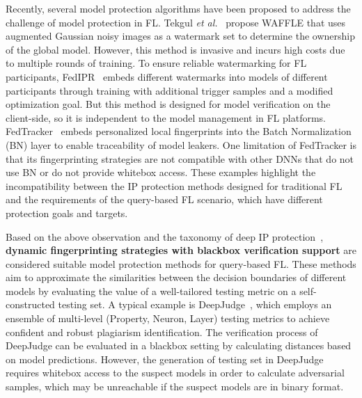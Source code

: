 \documentclass[journal]{IEEEtran}
\begin{document}
Recently, several model protection algorithms have been proposed to address the challenge of model protection in FL. 
Tekgul \textit{et al.}~\cite{tekgul2021waffle} propose WAFFLE that uses augmented Gaussian noisy images as a watermark set to determine the ownership of the global model. 
However, this method is invasive and incurs high costs due to multiple rounds of training.
To ensure reliable watermarking for FL participants, FedIPR~\cite{li2023fedipr} embeds different watermarks into models of different participants through training with additional trigger samples and a modified optimization goal.
But this method is designed for model verification on the client-side, so it is independent to the model management in FL platforms.
FedTracker~\cite{shao2022fedtracker} embeds personalized local fingerprints into the Batch Normalization (BN) layer to enable traceability of model leakers.
One limitation of FedTracker is that its fingerprinting strategies are not compatible with other DNNs that do not use BN or do not provide whitebox access.
These examples highlight the incompatibility between the IP protection methods designed for traditional FL and the requirements of the query-based FL scenario, which have different protection goals and targets.

Based on the above observation and the taxonomy of deep IP protection~\cite{peng2022intellectual, sun2023deep}, \textbf{dynamic fingerprinting strategies with blackbox verification support} are considered suitable model protection methods for query-based FL.
These methods aim to approximate the similarities between the decision boundaries of different models by evaluating the value of a well-tailored testing metric on a self-constructed testing set.
A typical example is DeepJudge~\cite{chen2022copy}, which employs an ensemble of multi-level (Property, Neuron, Layer) testing metrics to achieve confident and robust plagiarism identification. 
The verification process of DeepJudge can be evaluated in a blackbox setting by calculating distances based on model predictions.
However, the generation of testing set in DeepJudge requires whitebox access to the suspect models in order to calculate adversarial samples, which may be unreachable if the suspect models are in binary format.
\end{document}
